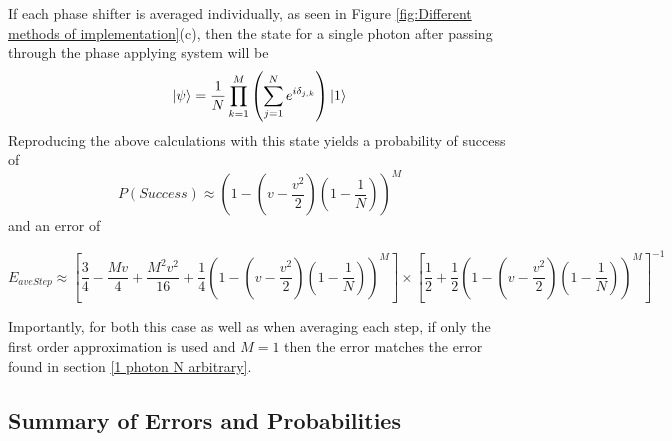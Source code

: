 \documentclass[aps,pra,twocolumn,superscriptaddress,numerical,floatfix]{revtex4-1}
\begin{document}
If each phase shifter is averaged individually, as seen in Figure \ref{fig:Different methods of implementation}(c), then the state for a single photon after passing through the phase applying system will be
\begin{equation}
	\ket{\psi}=\frac{1}{N}\prod_{k=1}^{M}\left(\sum_{j=1}^{N}e^{i\delta_{j,k}}\right)\ket{1}\label{eq:AveStepPhaseState}
\end{equation}
Reproducing the above calculations with this state yields a probability of success of
\begin{equation}
P\left(Success\right)\approx\left(1-\left(v-\frac{v^{2}}{2}\right)\left(1-\frac{1}{N}\right)\right)^{M}\label{eq:AvStepProbSuccess}
\end{equation}
and an error of
\begin{widetext}
\begin{equation}
E_{aveStep} \approx  \left[\frac{3}{4}-\frac{Mv}{4}+\frac{M^{2}v^{2}}{16}+\frac{1}{4}\left(1-\left(v-\frac{v^{2}}{2}\right)\left(1-\frac{1}{N}\right)\right)^{M}\right]\nonumber\times\left[\frac{1}{2}+\frac{1}{2}\left(1-\left(v-\frac{v^{2}}{2}\right)\left(1-\frac{1}{N}\right)\right)^{M}\right]^{-1}\label{eq:ErrorAvStep}
\end{equation}
\end{widetext}
Importantly, for both this case as well as when averaging each step, if only the first order approximation is used and $M=1$ then the error matches the error found in section \ref{1 photon N arbitrary}.

\subsection{Summary of Errors and Probabilities\label{Summary of Errors and Probabilities}}
\end{document}
